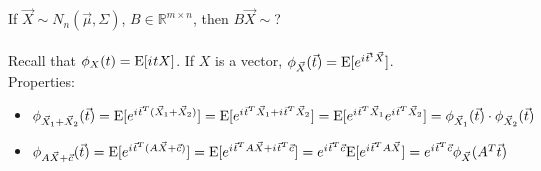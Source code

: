 \documentclass[12pt]{article}
\newcommand{\expected}[1]{\mathrm{E}[#1]}
\renewcommand{\i}{{i\mkern1mu}}
\begin{document}
If $\vec{X} \sim N_n(\vec{\mu}, \Sigma)$, $B \in \mathbb{R}^{m \times n}$, then $B\vec{X} \sim$? \\~\\
Recall that $\phi_X(t) = \expected{\i tX}$. If $X$ is a vector, $\phi_{\vec{X}}(\vec{t}) = \expected{e^{\i \vec{t}^t \vec{X}}}$. \\ Properties: \begin{itemize} 
\item $\phi_{\vec{X}_1 + \vec{X}_2}(\vec{t}) = \expected{e^{\i \vec{t}^T(\vec{X}_1 + \vec{X}_2)}} = \expected{e^{\i \vec{t}^T\vec{X}_1 + \i \vec{t}^T\vec{X}_2}} = \expected{e^{\i \vec{t}^T\vec{X}_1} e^{\i \vec{t}^T \vec{X}_2}} = \phi_{\vec{X}_1}(\vec{t}) \cdot \phi_{\vec{X}_2}(\vec{t})$ 
\item $\phi_{A\vec{X}+\vec{c}}(\vec{t}) = \expected{e^{\i \vec{t}^T(A\vec{X} + \vec{c})}} = \expected{e^{\i \vec{t}^TA\vec{X} + \i \vec{t}^T\vec{c}}} = e^{\i \vec{t}^T\vec{c}}\expected{e^{\i \vec{t}^TA\vec{X}}} = e^{\i \vec{t}^T\vec{c}}\phi_{\vec{X}}(A^T\vec{t}) $ \end{itemize} 
\end{document}
